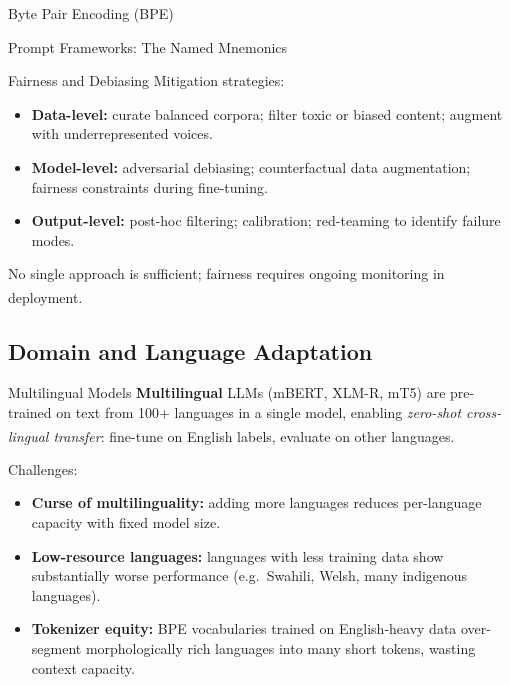 \begin{v3topic}{Byte Pair Encoding (BPE)}
\begin{v3topic}{Prompt Frameworks: The Named Mnemonics}
\begin{v3topic}{Fairness and Debiasing}
    Mitigation strategies:
    \begin{itemize}
        \item \textbf{Data-level:} curate balanced corpora; filter toxic or biased
              content; augment with underrepresented voices.
        \item \textbf{Model-level:} adversarial debiasing; counterfactual data
              augmentation; fairness constraints during fine-tuning.
        \item \textbf{Output-level:} post-hoc filtering; calibration; red-teaming to
              identify failure modes.
    \end{itemize}

    No single approach is sufficient; fairness requires ongoing monitoring in
    deployment.\textsuperscript{\cite[][p.~140]{farrisHowLargeLanguage2025}}

\end{v3topic}

\subsection{Domain and Language Adaptation}


\begin{v3topic}{Multilingual Models}
    \textbf{Multilingual} LLMs (mBERT, XLM-R, mT5) are pre-trained on text from 100+
    languages in a single model, enabling \emph{zero-shot cross-lingual transfer}:
    fine-tune on English labels, evaluate on other
    languages.\textsuperscript{\cite[][p.~26]{farrisHowLargeLanguage2025}}

    Challenges:
    \begin{itemize}
        \item \textbf{Curse of multilinguality:} adding more languages reduces
              per-language capacity with fixed model size.
        \item \textbf{Low-resource languages:} languages with less training data show
              substantially worse performance (e.g.\ Swahili, Welsh, many indigenous
              languages).
        \item \textbf{Tokenizer equity:} BPE vocabularies trained on English-heavy data
              over-segment morphologically rich languages into many short tokens, wasting
              context capacity.
    \end{itemize}


\end{v3topic}
\end{v3topic}
\end{v3topic}
